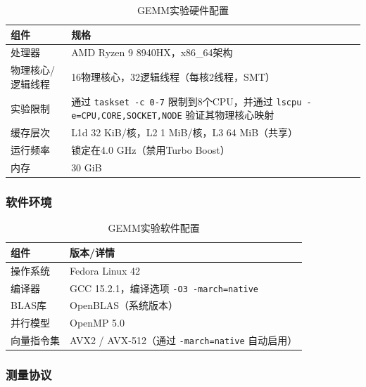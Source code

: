 \documentclass[a4paper,11pt,oneside]{article}
\begin{document}
\begin{table}[H]
\centering
\begin{tabular}{p{}p{}}
\toprule
\textbf{组件} & \textbf{规格} \\
\midrule
处理器 & AMD Ryzen 9 8940HX，x86\_64架构 \\
物理核心/逻辑线程 & 16物理核心，32逻辑线程（每核2线程，SMT）\\
实验限制 & 通过 \texttt{taskset -c 0-7} 限制到8个CPU，并通过 \texttt{lscpu -e=CPU,CORE,SOCKET,NODE} 验证其物理核心映射 \\
缓存层次 & L1d 32 KiB/核，L2 1 MiB/核，L3 64 MiB（共享）\\
运行频率 & 锁定在4.0 GHz（禁用Turbo Boost）\\
内存 & 30 GiB \\
\bottomrule
\end{tabular}
\caption{GEMM实验硬件配置}
\label{tab:gemm_hardware}
\end{table}

\subsubsection{软件环境}

\begin{table}[H]
\centering
\begin{tabular}{p{}p{}}
\toprule
\textbf{组件} & \textbf{版本/详情} \\
\midrule
操作系统 & Fedora Linux 42 \\
编译器 & GCC 15.2.1，编译选项 \texttt{-O3 -march=native} \\
BLAS库 & OpenBLAS（系统版本）\\
并行模型 & OpenMP 5.0 \\
向量指令集 & AVX2 / AVX-512（通过 \texttt{-march=native} 自动启用）\\
\bottomrule
\end{tabular}
\caption{GEMM实验软件配置}
\label{tab:gemm_software}
\end{table}

\subsubsection{测量协议}\label{subsec:gemm_protocol}
\end{document}
